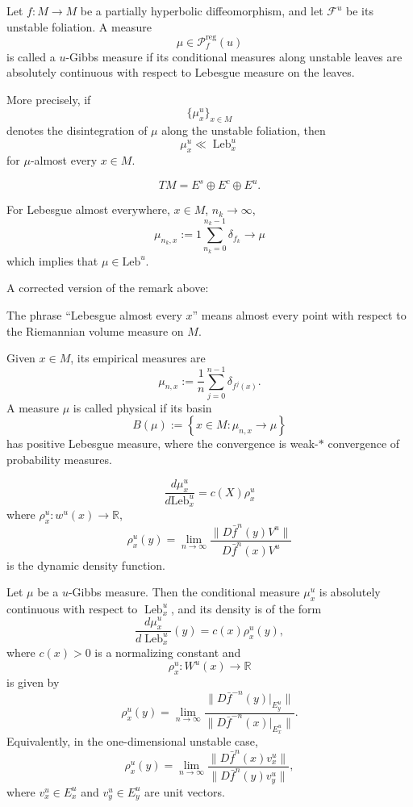 \begin{definition}[AI]
\label{definition-u-gibbs-measure}
Let $f:M \to M$ be a partially hyperbolic
diffeomorphism, and let
$\mathcal F^u$ be its unstable foliation.
A measure
$$
\mu \in \mathcal P_f^{\operatorname{reg}}(u)
$$
is called a $u$-Gibbs measure if its
conditional measures along unstable leaves
are absolutely continuous with respect to
Lebesgue measure on the leaves.

More precisely, if
$$
\{\mu_x^u\}_{x \in M}
$$
denotes the disintegration of $\mu$ along
the unstable foliation, then
$$
\mu_x^u \ll \operatorname{Leb}_x^u
$$
for $\mu$-almost every $x \in M$.
\end{definition}

\begin{remark}
\label{remark-stable-directions-dyn}
$$
TM = E^s \oplus E^c \oplus E^u.
$$
\end{remark}

\begin{remark}
\label{remark-leb-ae-ai}
For Lebesgue almost everywhere,
$x \in M$, $n_k \to \infty$,
$$
\mu_{n_k,x}
:=
1 \sum_{n_k=0}^{n_k-1}
\delta_{f_k} \to \mu
$$
which implies that $\mu \in 
\text{Leb}^u$.
\end{remark}

\noindent
A corrected version of the remark above:

\begin{remark}
\label{remark-lebesgue-ae}
The phrase ``Lebesgue almost every $x$''
means almost every point with respect to
the Riemannian volume measure on $M$.

Given $x \in M$, its empirical measures are
$$
\mu_{n,x}
:=
\frac{1}{n}
\sum_{j=0}^{n-1}
\delta_{f^j(x)}.
$$
A measure $\mu$ is called physical if its
basin
$$
B(\mu)
:=
\left\{
x \in M :
\mu_{n,x} \to \mu
\right\}
$$
has positive Lebesgue measure, where the
convergence is weak-$*$ convergence of
probability measures.
\end{remark}

\begin{lemma}
\label{lemma-ledrappier}
$$
\frac{d\mu^u_x}{
d\text{Leb}_x^u}
=c(X)\rho_x^u
$$
where $\rho_x^u:w^u(x)\to \mathbb{R}$,
$$
\rho_x^u(y)
=
\lim_{n \to \infty} 
\frac{\|D\bar{f}^n(y)V^u\|}{
D\bar{f}^n(x) V^u}
$$
is the dynamic density function.
\end{lemma}
\begin{lemma}
\label{lemma-ledrappier-density}
Let $\mu$ be a $u$-Gibbs measure. Then the
conditional measure $\mu_x^u$ is absolutely
continuous with respect to $\operatorname{Leb}_x^u$,
and its density is of the form
$$
\frac{d\mu_x^u}{d\operatorname{Leb}_x^u}(y)
=
c(x)\rho_x^u(y),
$$
where $c(x)>0$ is a normalizing constant and
$$
\rho_x^u:W^u(x)\to \mathbb R
$$
is given by
$$
\rho_x^u(y)
=
\lim_{n\to\infty}
\frac{
\|D\bar f^{-n}(y)|_{E_y^u}\|
}{
\|D\bar f^{-n}(x)|_{E_x^u}\|
}.
$$
Equivalently, in the one-dimensional unstable
case,
$$
\rho_x^u(y)
=
\lim_{n\to\infty}
\frac{
\|D\bar f^n(x)v_x^u\|
}{
\|D\bar f^n(y)v_y^u\|
},
$$
where $v_x^u\in E_x^u$ and $v_y^u\in E_y^u$
are unit vectors.
\end{lemma}

